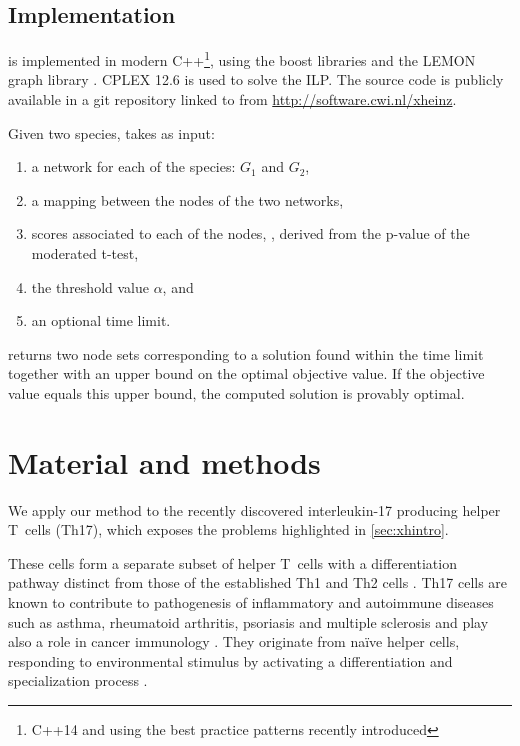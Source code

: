 	\subsection{Implementation}

	\xheinz{} is implemented in modern C++\footnote{C++14 and using the best practice patterns recently introduced}, using the boost libraries and the LEMON graph library \parencite{dezsHo2011lemon}.
		CPLEX 12.6 is used to solve the ILP\@.
		The source code is publicly available in a git repository linked to from \mbox{\url{http://software.cwi.nl/xheinz}}.

		Given two species, \xheinz{} takes as input:
		\begin{enumerate}
			\item a network for each of the species: $G_1$ and $G_2$,
			\item a mapping between the nodes of the two networks,
			\item scores associated to each of the nodes, \eg, derived from the p-value of the moderated t-test,
			\item the threshold value $\alpha$, and
			\item an optional time limit.
		\end{enumerate}

		\xheinz{} returns two node sets corresponding to a solution found within the time limit together with an upper bound on the optimal objective value.
		If the objective value equals this upper bound, the computed solution is provably optimal.

\section{Material and methods}
\label{sec:xexp}

We apply our method to the recently discovered interleukin-17 producing helper T~cells (Th17), which exposes the problems highlighted in \cref{sec:xhintro}.

These cells form a separate subset of helper T~cells with a differentiation pathway distinct from those of the established Th1 and Th2 cells \parencite{park2005distinct}.
Th17 cells are known to contribute to pathogenesis of inflammatory and autoimmune diseases such as
asthma, rheumatoid arthritis, psoriasis and multiple sclerosis and play also a role in cancer immunology \parencite{wilke2011deciphering}.
They originate from na\"ive helper cells, responding to environmental stimulus by activating a differentiation and specialization process \parencite{steinman2007brief}.

